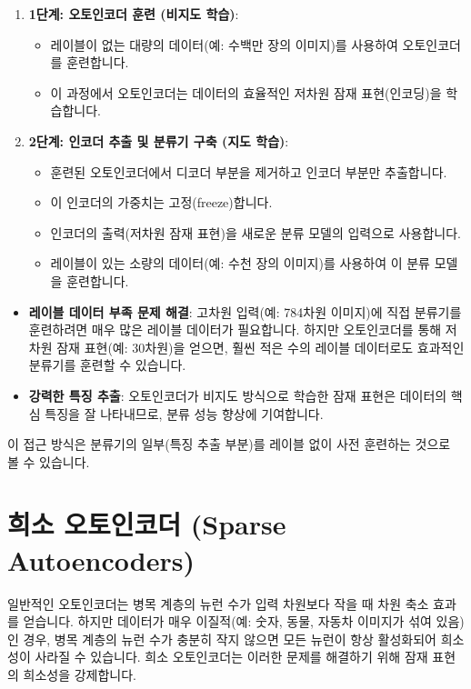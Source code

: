 \documentclass[11pt,a4paper]{article}
\theoremstyle{definition}
\begin{document}
\begin{enumerate}
    \item \textbf{1단계: 오토인코더 훈련 (비지도 학습)}:
        \begin{itemize}
            \item 레이블이 없는 대량의 데이터(예: 수백만 장의 이미지)를 사용하여 오토인코더를 훈련합니다.
            \item 이 과정에서 오토인코더는 데이터의 효율적인 저차원 잠재 표현(인코딩)을 학습합니다.
        \end{itemize}
    \item \textbf{2단계: 인코더 추출 및 분류기 구축 (지도 학습)}:
        \begin{itemize}
            \item 훈련된 오토인코더에서 디코더 부분을 제거하고 인코더 부분만 추출합니다.
            \item 이 인코더의 가중치는 고정(freeze)합니다.
            \item 인코더의 출력(저차원 잠재 표현)을 새로운 분류 모델의 입력으로 사용합니다.
            \item 레이블이 있는 소량의 데이터(예: 수천 장의 이미지)를 사용하여 이 분류 모델을 훈련합니다.
        \end{itemize}
\end{enumerate}

\begin{infobox}
\begin{itemize}
    \item \textbf{레이블 데이터 부족 문제 해결}: 고차원 입력(예: 784차원 이미지)에 직접 분류기를 훈련하려면 매우 많은 레이블 데이터가 필요합니다. 하지만 오토인코더를 통해 저차원 잠재 표현(예: 30차원)을 얻으면, 훨씬 적은 수의 레이블 데이터로도 효과적인 분류기를 훈련할 수 있습니다.
    \item \textbf{강력한 특징 추출}: 오토인코더가 비지도 방식으로 학습한 잠재 표현은 데이터의 핵심 특징을 잘 나타내므로, 분류 성능 향상에 기여합니다.
\end{itemize}
이 접근 방식은 분류기의 일부(특징 추출 부분)를 레이블 없이 사전 훈련하는 것으로 볼 수 있습니다.
\end{infobox}

\newpage
\section{희소 오토인코더 (Sparse Autoencoders)}
일반적인 오토인코더는 병목 계층의 뉴런 수가 입력 차원보다 작을 때 차원 축소 효과를 얻습니다. 하지만 데이터가 매우 이질적(예: 숫자, 동물, 자동차 이미지가 섞여 있음)인 경우, 병목 계층의 뉴런 수가 충분히 작지 않으면 모든 뉴런이 항상 활성화되어 희소성이 사라질 수 있습니다. 희소 오토인코더는 이러한 문제를 해결하기 위해 잠재 표현의 희소성을 강제합니다.
\end{document}
